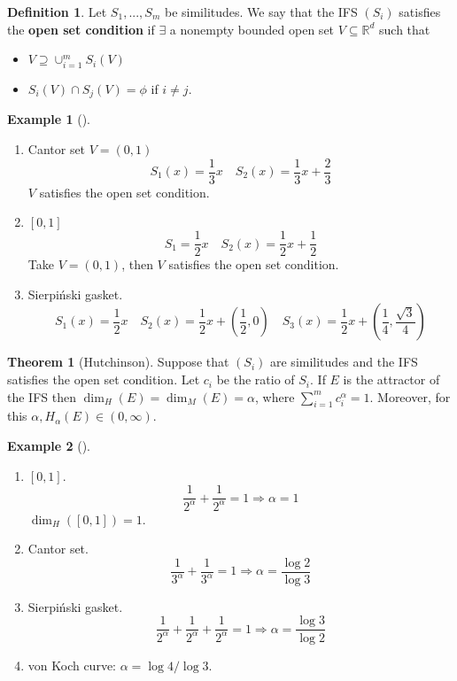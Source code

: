 \documentclass{article}
\theoremstyle{definition}
\newtheorem{thm}{Theorem}
\newtheorem{ex}{Example}
\newtheorem{dfn}{Definition}
\newenvironment{exs}[1][]{%
  \begin{ex}[#1]$ $\par\nobreak\ignorespaces
}{%
  \end{ex}
}
\newcommand{\RR}{\mathbb R}
\newcommand{\Ra}{\Rightarrow}
\begin{document}
\begin{dfn}
	Let $S_1, ..., S_m$ be similitudes.
	We say that the IFS $(S_i)$ satisfies the \textbf{open set condition} if $\exists$ a nonempty bounded open set $V \subseteq \RR^d$ such that
	\begin{itemize}
		\item $V \supseteq \cup_{i = 1}^m S_i(V)$

		\item $S_i(V) \cap S_j(V) = \phi$ if $i \neq j$.
	\end{itemize}
\end{dfn}

\begin{exs}
	\begin{enumerate}
		\item Cantor set $V = (0, 1)$
			\[
				S_1(x) = \frac{1}{3} x \quad S_2(x) = \frac{1}{3}x + \frac{2}{3}
			\]
			$V$ satisfies the open set condition.

		\item $[0, 1]$
			\[
				S_1 = \frac{1}{2} x \quad S_2(x) = \frac{1}{2} x + \frac{1}{2}
			\]
			Take $V = (0, 1)$, then $V$ satisfies the open set condition.

		\item Sierpi\'nski gasket.
			\[
				S_1(x) = \frac{1}{2} x \quad S_2(x) = \frac{1}{2} x + \left(\frac{1}{2}, 0\right) \quad S_3(x) = \frac{1}{2} x + \left(\frac{1}{4}, \frac{\sqrt{3}}{4}\right)
			\]
	\end{enumerate}
\end{exs}

\begin{thm}[Hutchinson]
	Suppose that $(S_i)$ are similitudes and the IFS satisfies the open set condition.
	Let $c_i$ be the ratio of $S_i$.
	If $E$ is the attractor of the IFS then $\dim_H(E) = \dim_M(E) = \alpha$, where $\sum_{i = 1}^m c_i^\alpha = 1$.
	Moreover, for this $\alpha, H_\alpha(E) \in (0, \infty)$.
\end{thm}

\begin{exs}
	\begin{enumerate}
		\item $[0, 1]$.
			\[
				\frac{1}{2^\alpha} + \frac{1}{2^\alpha} = 1 \Ra \alpha = 1
			\]
			$\dim_H([0, 1]) = 1$.

		\item Cantor set.
			\[
				\frac{1}{3^\alpha} + \frac{1}{3^\alpha} = 1 \Ra \alpha = \frac{\log 2}{\log 3}
			\]

		\item Sierpi\'nski gasket.
			\[
				\frac{1}{2^\alpha} +\frac{1}{2^\alpha} + \frac{1}{2^\alpha} = 1 \Ra \alpha = \frac{\log 3}{\log 2}
			\]

		\item von Koch curve: $\alpha = \log 4/\log 3$.
	\end{enumerate}
\end{exs}
\end{document}
